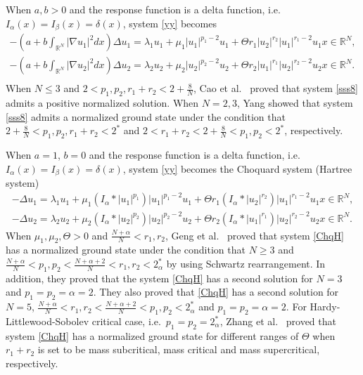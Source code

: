 \documentclass[10pt,a4paper]{amsart}
\numberwithin{equation}{section}
\begin{document}
When $a,b>0$ and the response function is a delta function,
i.e.\ $I_\alpha(x)=I_\beta(x)=\delta(x)$,
system \eqref{yy} becomes
\begin{equation}\label{sss8}
\begin{gathered}
 -(a+b\int_{\mathbb{R}^N}|\nabla u_1|^2dx)\Delta u_1=\lambda_1 u_1+\mu_1|u_1|^{p_1-2}u_1+
 \Theta r_1|u_2|^{r_2}|u_1|^{r_1-2}u_1   x\in\mathbb{R}^N,\\
-(a+b\int_{\mathbb{R}^N}|\nabla u_2|^2dx)\Delta u_2=\lambda_2 u_2+\mu_2|u_2|^{p_2-2}u_2+
 \Theta r_2|u_1|^{r_1}|u_2|^{r_2-2}u_2   x\in\mathbb{R}^N.\\
 \end{gathered}
\end{equation}
When $N\leq3$ and $2<p_1,p_2,r_1+r_2<2+\frac{8}{N}$, Cao et al.\
 \cite{kf2} proved that system \eqref{sss8} admits a positive
normalized solution. When $N=2,3$, Yang \cite{Kf3} showed that system
\eqref{sss8} admits a normalized ground state under the condition that
$2+\frac{8}{N}<p_1,p_2,r_1+r_2<2^*$ and $2<r_1+r_2<2+\frac{8}{N}<p_1,p_2<2^*$,
respectively.

When $a=1$, $b=0$ and the response function is a delta function, i.e.\
$I_\alpha(x)=I_\beta(x)=\delta(x)$,
system \eqref{yy} becomes the   Choquard system (Hartree system)
\begin{equation}\label{ChqH}
 \begin{gathered}
-\Delta u_1=\lambda_1 u_1+\mu_1(I_\alpha\ast|u_1|^{p_1})|u_1|^{p_1-2}u_1
+\Theta r_1(I_\alpha\ast|u_2|^{r_2})|u_1|^{r_1-2}u_1   x\in\mathbb{R}^N,\\
-\Delta u_2=\lambda_2 u_2+\mu_2(I_\alpha\ast|u_2|^{p_2})|u_2|^{p_2-2}u_2
+\Theta r_2(I_\alpha\ast|u_1|^{r_1})|u_2|^{r_2-2}u_2   x\in\mathbb{R}^N.
 \end{gathered}
\end{equation}
When $\mu_1,\mu_2,\Theta>0$ and $\frac{N+\alpha}{N}<r_1,r_2$, Geng et al.\
\cite{JFx} proved that system \eqref{ChqH}
has a normalized ground state under the condition that $N\geq3$ and
$\frac{N+\alpha}{N}<p_1,p_2<\frac{N+\alpha+2}{N}<r_1,r_2<2_\alpha^*$
by using Schwartz rearrangement. In addition, they proved that the system
\eqref{ChqH} has a second solution
for $N=3$ and $p_1=p_2=\alpha=2$.
They also proved that  \eqref{ChqH} has a second solution
for $N=5$, $\frac{N+\alpha}{N}<r_1,r_2<\frac{N+\alpha+2}{N}<p_1,p_2<2_\alpha^*$ and
$p_1=p_2=\alpha=2$. For
Hardy-Littlewood-Sobolev critical case, i.e.\ $p_1=p_2=2_\alpha^*$, Zhang et al.\
\cite{linjie} proved that system \eqref{ChqH}
has a normalized ground state for different ranges of $\Theta$ when $r_1+r_2$ is set
to be mass subcritical, mass critical and mass supercritical, respectively.
\end{document}
